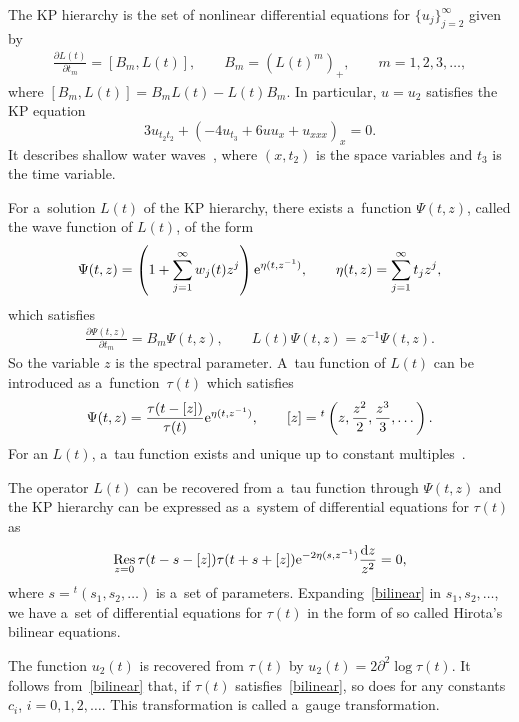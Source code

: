\documentclass[10pt,a4paper]{amsart}
\numberwithin{equation}{section}
\theoremstyle{definition}
\begin{document}
The KP hierarchy is the set of nonlinear differential equations for $\{u_j\}_{j=2}^\infty$
given by
\begin{gather}
\frac{\partial L(t)}{\partial t_m}=\left[B_m,L(t)\right],
\qquad
B_m=\left(L(t)^m\right)_{+},\qquad m=1,2,3,\dots,
\label{KP-hierarchy}
\end{gather}
where $[B_m, L(t)]=B_mL(t)-L(t)B_m$.
In particular, $u=u_2$ satisfies the KP equation
\[%
3u_{t_2t_2}+(-4u_{t_3}+6uu_x+u_{xxx})_x=0.
\]
It describes shallow water waves~\cite{Kodama2017}, where $(x,t_2)$ is the space
variables and $t_3$ is the time variable.

For a~solution $L(t)$ of the KP hierarchy, there exists a~function $\Psi(t,z)$, called
the wave function of $L(t)$,
of the form
\begin{gather*}
\Psi(t,z)=\left(1+\sum_{j=1}^\infty w_j(t) z^j\right){\rm e}^{\eta(t,z^{-1})},
\qquad
\eta(t,z)=\sum_{j=1}^\infty t_j z^{j},
\end{gather*}
which satisfies
\begin{gather}
\frac{\partial \Psi(t,z)}{\partial t_m}=B_m \Psi(t,z),\qquad
L(t)\Psi(t,z)=z^{-1}\Psi(t,z).
\label{linear-eq}
\end{gather}
So the variable $z$ is the spectral parameter.
 A~tau function of $L(t)$ can be introduced as a~function~$\tau(t)$ which satisfies
\begin{gather}
\Psi(t,z)=\frac{\tau(t-[z])}{\tau(t)}{\rm e}^{\eta(t,z^{-1})},
\qquad
[z]={}^t\left(z,\frac{z^2}{2},\frac{z^3}{3},\dots \right).
\label{wave-function}
\end{gather}
For an $L(t)$, a~tau function exists and unique up to constant multiples~\cite{DJKM}.

The operator $L(t)$ can be recovered from a~tau function through $\Psi(t,z)$ and
the KP hierarchy can be expressed as a~system of differential equations for $\tau(t)$ as
\begin{gather}
\mathop{{\rm Res}}_{z=0} \tau(t-s-[z])\tau(t+s+[z]){\rm e}^{-2\eta(s,z^{-1})}\frac{{\rm d}z}{z^2}=0,
\label{bilinear}
\end{gather}
where $s={}^t(s_1,s_2,\dots )$ is a~set of parameters. Expanding~\eqref{bilinear} in $s_1,s_2,\dots $, we have a~set
of differential equations for $\tau(t)$ in the form of so called Hirota's bilinear equations.

The function $u_2(t)$ is recovered from $\tau(t)$ by
$
u_2(t)=2\partial^2\log \tau(t)$.
It follows from~\eqref{bilinear} that, if $\tau(t)$ satisfies~\eqref{bilinear},
so does 
 for any constants $c_i$, $i=0,1,2,\dots $.
This transformation
 is called a~gauge transformation.
\end{document}
